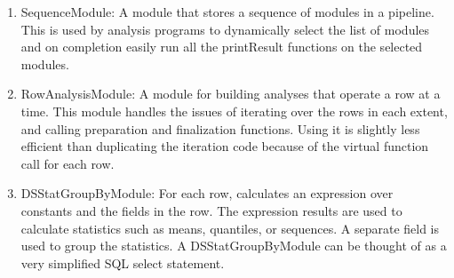 \begin{enumerate}
  \item SequenceModule: A module that stores a sequence of modules in
a pipeline.  This is used by analysis programs to dynamically
select the list of modules and on completion easily run all the printResult
functions on the selected modules.

  \item RowAnalysisModule: A module for building analyses that operate
a row at a time.  This module handles the issues of iterating over the
rows in each extent, and calling preparation and finalization
functions.  Using it is slightly less efficient than duplicating the
iteration code because of the virtual function call for each row.

  \item DSStatGroupByModule: For each row, calculates an expression
over constants and the fields in the row.  The expression results are
used to calculate statistics such as means, quantiles, or sequences.
A separate field is used to group the statistics.  A
DSStatGroupByModule can be thought of as a very simplified SQL select
statement.

\end{enumerate}


